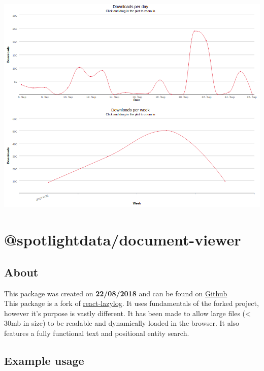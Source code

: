 \documentclass{article}
\begin{document}
\begin{center}
  \includegraphics[scale=0.5]{es-search.png}
\end{center}

\newpage

\section{@spotlightdata/document-viewer}

\subsection{About}
\begin{flushleft}
This package was created on \textbf{22/08/2018} and can be found on \href{https://github.com/SpotlightData/react-lazylog}{Github}\\
This package is a fork of \href{https://github.com/mozilla-frontend-infra/react-lazylog}{react-lazylog}. It uses fundamentals of the forked project, however it's purpose is vastly different. It has been made to allow large files (< 30mb in size) to be readable and dynamically loaded in the browser. It also features a fully functional text and positional entity search.
\end{flushleft}

\subsection{Example usage}
\end{document}

